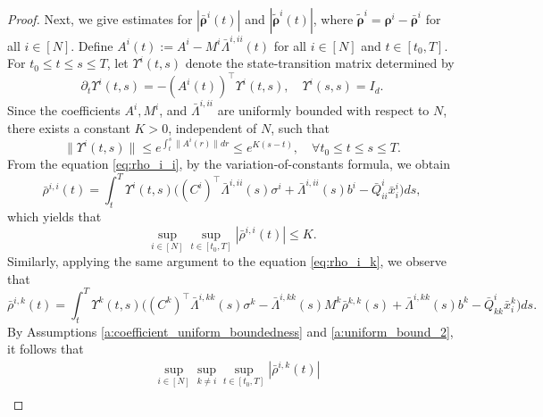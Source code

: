 \documentclass[10pt,a4paper]{amsart}
\def\wt{\widetilde}
\begin{document}
\begin{proof}
Next, we give estimates for $|\bar{\bm{\rho}}^i(t)|$ and $|\wt{\bm{\rho}}^i(t)|$, where $\wt{\bm{\rho}}^i = \bm{\rho}^i - \bar{\bm{\rho}}^i$ for all $i \in [N]$. 
Define $A^i(t) := A^i - M^i \bar{\Lambda}^{i,ii}(t)$ for all $i \in [N]$ and $t \in [t_0, T]$.
For $t_0 \leq t \leq s \leq T$, let $\Upsilon^i(t,s)$ denote the state-transition matrix determined by
$$\partial_t \Upsilon^i(t,s) = - (A^i(t))^\top \Upsilon^i(t, s), \quad \Upsilon^i(s,s) = I_d.$$
Since the coefficients $A^i, M^i$, and $\bar{\Lambda}^{i,ii}$ are uniformly bounded with respect to $N$, there exists a constant $K > 0$, independent of $N$, such that
$$\|\Upsilon^i(t,s)\| \leq e^{\int_t^s\|A^i(r)\| dr} \leq e^{K(s-t)}, \quad \forall t_0 \leq t \leq s \leq T.$$
From the equation \eqref{eq:rho_i_i}, by the variation-of-constants formula, we obtain
$$\bar{\rho}^{i,i}(t) = \int_t^T \Upsilon^i(t,s) \big((C^i)^\top \bar{\Lambda}^{i,ii}(s) \sigma^i + \bar{\Lambda}^{i,ii}(s) b^i - \bar{Q}^i_{ii} \bar{x}^i_i \big) ds,$$
which yields that
$$\sup_{i \in [N]} \sup_{t \in [t_0, T]} |\bar{\rho}^{i,i}(t)| \leq K.$$
Similarly, applying the same argument to the equation \eqref{eq:rho_i_k}, we observe that
$$\bar{\rho}^{i,k}(t) = \int_t^T \Upsilon^k(t,s) \big((C^k)^\top \bar{\Lambda}^{i,kk}(s) \sigma^k - \bar{\Lambda}^{i,kk}(s) M^k \bar{\rho}^{k,k}(s) + \bar{\Lambda}^{i,kk}(s) b^k - \bar{Q}^i_{kk} \bar{x}^k_i \big) ds.$$
By Assumptions \ref{a:coefficient_uniform_boundedness} and \ref{a:uniform_bound_2}, it follows that
\begin{equation*}
\begin{aligned}
& \sup_{i \in [N]} \sup_{k \neq i} \sup_{t \in [t_0, T]} |\bar{\rho}^{i,k}(t)| \\

\end{aligned}
\end{equation*}
\end{proof}
\end{document}
